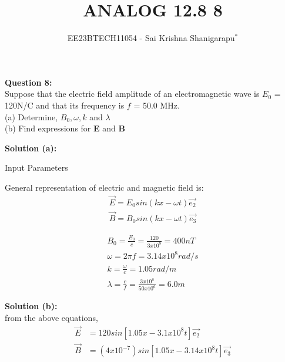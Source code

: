 \documentclass[journal,12pt,twocolumn]{IEEEtran}
\theoremstyle{remark}
\begin{document}

\vspace{3cm}

\title{ANALOG 12.8 8}
\author{EE23BTECH11054 - Sai Krishna Shanigarapu$^{*}$%
}
\maketitle
\newpage
\bigskip

\begin{flushleft}
\textbf{Question 8:}\\
Suppose that the electric field amplitude of an electromagnetic wave is $E_0$ = 120N/C and that its frequency is $f$ = 50.0 MHz.\\
(a) Determine, $B_0, \omega, k$ and $\lambda$\\
(b) Find expressions for \textbf{E} and \textbf{B}\\
\end{flushleft}

\bigskip

\begin{flushleft}
\textbf{Solution (a):}\\
\end{flushleft}

\begin{center}
    \begin{table}[h]
        \caption{Input Parameters}
        
        \label{tab:table1.12.8.8}
    \end{table}
\end{center}

\begin{flushleft}
   General representation of electric and magnetic field is:\\
   \begin{align}
   \vec{E} = E_0sin(kx - \omega t)\vec{e_2}\\
   \vec{B} = B_0sin(kx - \omega t)\vec{e_3}
   \end{align}

   \begin{align}
    B_0 = \frac{E_0}{c} = \frac{120}{3 x 10^8} = 400nT\\
    \omega = 2\pi f = 3.14 x 10^8 rad/s\\
    k = \frac{\omega}{c} = 1.05 rad/m\\
    \lambda = \frac{c}{f} = \frac{3 x 10^8}{50 x 10^6} = 6.0m    
    \end{align}

\bigskip

    \textbf{Solution (b):}\\
    \bigskip
    from the above equations, \\
    \begin{align}
    \vec{E} &= 120 sin[1.05x - 3.1 x 10^8t]\vec{e_2}\\
    \vec{B} &= (4 x 10^{-7})sin[1.05x - 3.14 x 10^8t]\vec{e_3}
    \end{align} 
\end{flushleft}
\end{document}
